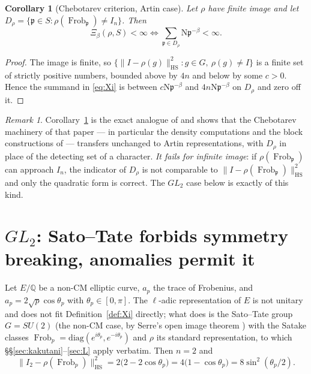 \documentclass[11pt]{amsart}
\numberwithin{equation}{section}
\newtheorem{corollary}[theorem]{Corollary}
\theoremstyle{definition}
\theoremstyle{remark}
\newtheorem{remark}[theorem]{Remark}
\newcommand{\Q}{\mathbb{Q}}
\newcommand{\pp}{\mathfrak{p}}
\newcommand{\Ns}{\mathrm{N}}
\newcommand{\Frob}{\operatorname{Frob}}
\newcommand{\HS}{\mathrm{HS}}
\begin{document}
\begin{corollary}[Chebotarev criterion, Artin case]\label{cor:cheb}
Let $\rho$ have finite image and let $D_\rho=\{\pp\in S:\rho(\Frob_\pp)\ne I_n\}$. Then
\[
\Xi_\beta(\rho,S)<\infty\iff\sum_{\pp\in D_\rho}\Ns\pp^{-\beta}<\infty .
\]
\end{corollary}

\begin{proof}
The image is finite, so $\{\|I-\rho(g)\|_{\HS}^2:g\in G,\ \rho(g)\ne I\}$ is a finite set of
strictly positive numbers, bounded above by $4n$ and below by some $c>0$. Hence the summand
in \eqref{eq:Xi} is between $c\Ns\pp^{-\beta}$ and $4n\Ns\pp^{-\beta}$ on $D_\rho$ and zero
off it.
\end{proof}

\begin{remark}
Corollary~\ref{cor:cheb} is the exact analogue of \cite[Thm.~3.9]{Main} and shows that the
Chebotarev machinery of that paper --- in particular the density computations and the block
constructions of \cite[\S5]{SeriesI} --- transfers unchanged to Artin representations, with
$D_\rho$ in place of the detecting set of a character. \emph{It fails for infinite image}:
if $\rho(\Frob_\pp)$ can approach $I_n$, the indicator of $D_\rho$ is not comparable to
$\|I-\rho(\Frob_\pp)\|_{\HS}^2$ and only the quadratic form is correct. The $GL_2$ case below
is exactly of this kind.
\end{remark}

\section{$GL_2$: Sato--Tate forbids symmetry breaking, anomalies permit it}

Let $E/\Q$ be a non-CM elliptic curve, $a_p$ the trace of Frobenius, and
$a_p=2\sqrt p\cos\theta_p$ with $\theta_p\in[0,\pi]$. The $\ell$-adic representation of $E$
is not unitary and does not fit Definition~\ref{def:Xi} directly; what does is the
Sato--Tate group $G=SU(2)$ (the non-CM case, by Serre's open image theorem \cite{Serre})
with the Satake classes $\Frob_p=\mathrm{diag}(e^{i\theta_p},e^{-i\theta_p})$ and $\rho$
its standard representation, to which \S\S\ref{sec:kakutani}--\ref{sec:L} apply verbatim.
Then $n=2$ and
\begin{equation}\label{eq:ST}
\bigl\|I_2-\rho(\Frob_p)\bigr\|_{\HS}^2=2\bigl(2-2\cos\theta_p\bigr)=4\bigl(1-\cos\theta_p\bigr)=8\sin^2(\theta_p/2).
\end{equation}
\end{document}
